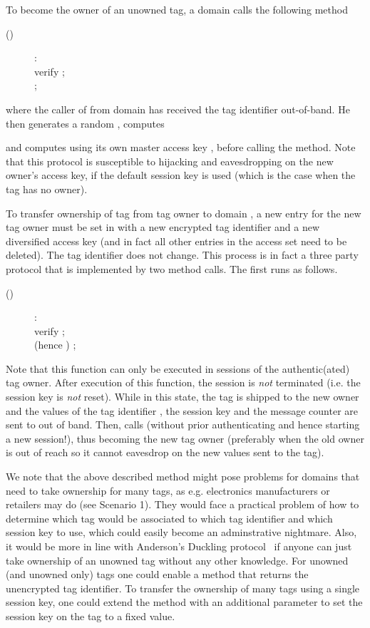 To become the owner of an unowned tag, a domain calls the following method
\begin{description}
\item[()]:\\
	verify  ; \\
	 ; \\
\end{description}
where the caller of  from domain  
has received the tag identifier  out-of-band. 
He then generates a random , computes

and computes
 using its own master access key , before
calling the method.
Note that this protocol is susceptible to hijacking and eavesdropping on the new owner's access
key, if the default session key  is used (which is the case when the tag
has no owner). 

To transfer ownership of tag  from tag owner  to
domain , a new entry for the new tag owner must be set in
 with a new encrypted tag identifier and a new diversified access
key (and in fact all other entries in the access set need to be deleted). 
The tag identifier does not change. This process is in fact a three party
protocol that is implemented by two method calls. The first runs as follows.
\begin{description}
\item[()]:\\
	verify  ; \\
	 (hence ) ; 
\end{description}
Note that this function can only be executed in sessions of the authentic(ated) tag owner. 
After execution of this function, the session is \emph{not} terminated 
(i.e. the session key is \emph{not} reset). While in this state, the tag is 
shipped to the new owner  and the values of the tag identifier , 
the session key  and the message counter  are sent to  out of band.
Then,  calls 
(without prior authenticating and hence starting a new session!), 
thus becoming the new tag owner
(preferably when the old owner is out of reach so it cannot eavesdrop 
on the new values sent to the tag).

We note that the above described method might pose problems for domains that
need to take ownership for many tags, as e.g. electronics manufacturers or
retailers may do (see Scenario 1). They would face a practical problem of how
to determine which tag would be associated to which tag identifier and which
session key to use, which could
easily become an adminstrative nightmare. Also, it would be more in line with
Anderson's Duckling protocol~\cite{StaA99,stajano2000duckling-what-next} if
anyone can just take ownership of an unowned tag without any other
knowledge. For unowned (and unowned only) tags one could enable a method
that returns the unencrypted tag identifier. To transfer the ownership of many
tags using a single session key, one could extend the method
 with an additional parameter  to set the
session key on the tag to a fixed value.

